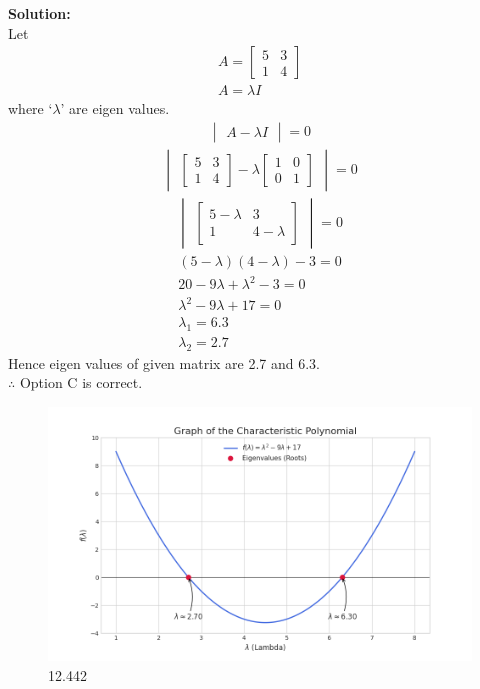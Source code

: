 \documentclass[journal]{IEEEtran}
\begin{document}
\textbf{Solution:}\\
Let 
\begin{align}
A = \begin{bmatrix} 5 & 3 \\ 1 & 4 \end{bmatrix}\\
A = \lambda I
\end{align}
where `$\lambda$' are eigen values.
\begin{align}
\begin{vmatrix} A - \lambda I \end{vmatrix} = 0
\end{align}
\begin{align}
\begin{vmatrix} \begin{bmatrix} 5 & 3 \\ 1 & 4 \end{bmatrix} - \lambda \begin{bmatrix} 1 & 0 \\ 0 & 1 \end{bmatrix} \end{vmatrix} = 0
\end{align}
\begin{align}
\begin{vmatrix} \begin{bmatrix} 5-\lambda & 3 \\ 1 & 4-\lambda \end{bmatrix} \end{vmatrix} = 0
\end{align}
\begin{align}
(5-\lambda)(4-\lambda) - 3 = 0\\
20 - 9\lambda + \lambda^2 - 3 = 0\\
\lambda^2 - 9\lambda + 17 = 0\\
\lambda_1 = 6.3\\
\lambda_2 = 2.7
\end{align}
Hence eigen values of given matrix are 2.7 and 6.3.\\
$\therefore$ Option C is correct.

\begin{figure}
    \centering
    \includegraphics[width=0.85\columnwidth]{figs/graph23.png}
    \caption{12.442}
    \label{fig:placeholder}
\end{figure}
\end{document}
